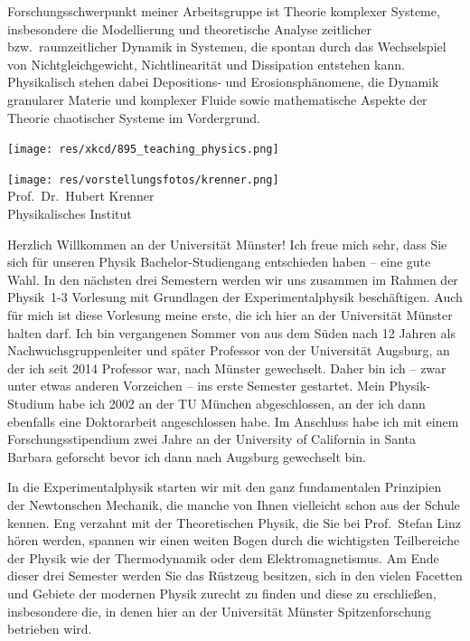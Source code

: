\begin{multicols}{2}
Forschungsschwerpunkt meiner Arbeitsgruppe ist Theorie komplexer Systeme, insbesondere die Modellierung und theoretische Analyse zeitlicher bzw.\ raumzeitlicher Dynamik in Systemen, die spontan durch das Wechselspiel von Nichtgleichgewicht, Nichtlinearität und Dissipation entstehen kann. Physikalisch stehen dabei Depositions- und Erosionsphänomene, die Dynamik granularer Materie und komplexer Fluide sowie mathematische Aspekte der Theorie chaotischer Systeme im Vordergrund.

\begin{center}
	\texttt{[image: res/xkcd/895\_teaching\_physics.png]}
\end{center}

\medskip

\begin{center}
\end{center}

\newpage

\vspace*{\fill}

\begin{multicols}{2}
\begin{center}
\texttt{[image: res/vorstellungsfotos/krenner.png]}\\
\smallskip
Prof.\ Dr.\ Hubert Krenner\\
Physikalisches Institut
\end{center}

Herzlich Willkommen an der Universität Münster! Ich freue mich sehr, dass Sie sich für unseren Physik Bachelor-Studiengang entschieden haben – eine gute Wahl. In den nächsten drei Semestern werden wir uns zusammen im Rahmen der Physik~1-3 Vorlesung mit Grundlagen der Experimentalphysik beschäftigen. Auch für mich ist diese Vorlesung meine erste, die ich hier an der Universität Münster halten darf. Ich bin vergangenen Sommer von aus dem Süden nach 12 Jahren als Nachwuchsgruppenleiter und später Professor von der Universität Augsburg, an der ich seit 2014 Professor war, nach Münster gewechselt. Daher bin ich – zwar unter etwas anderen Vorzeichen – ins erste Semester gestartet. Mein Physik-Studium habe ich 2002 an der TU München abgeschlossen, an der ich dann ebenfalls eine Doktorarbeit angeschlossen habe. Im Anschluss habe ich mit einem Forschungsstipendium zwei Jahre an der University of California in Santa Barbara geforscht bevor ich dann nach Augsburg gewechselt bin.

In die Experimentalphysik starten wir mit den ganz fundamentalen Prinzipien der Newtonschen Mechanik, die manche von Ihnen vielleicht schon aus der Schule kennen. Eng verzahnt mit der Theoretischen Physik, die Sie bei Prof.\ Stefan Linz hören werden, spannen wir einen weiten Bogen durch die wichtigsten Teilbereiche der Physik wie der Thermodynamik oder dem Elektromagnetismus. Am Ende dieser drei Semester werden Sie das Rüstzeug besitzen, sich in den vielen Facetten und Gebiete der modernen Physik zurecht zu finden und diese zu erschließen, insbesondere die, in denen hier an der Universität Münster Spitzenforschung betrieben wird.


\end{multicols}
\end{multicols}

